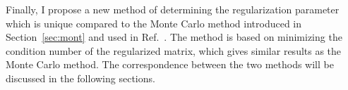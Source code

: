 Finally, I propose a new method of determining the regularization
parameter which is unique compared to the Monte Carlo method
introduced in Section~\ref{sec:mont} and used in Ref.~\cite{bea}. The method is based on minimizing the condition number of the regularized matrix, which gives similar results as the Monte Carlo method. The correspondence between the two methods will be discussed in the following sections.




 



